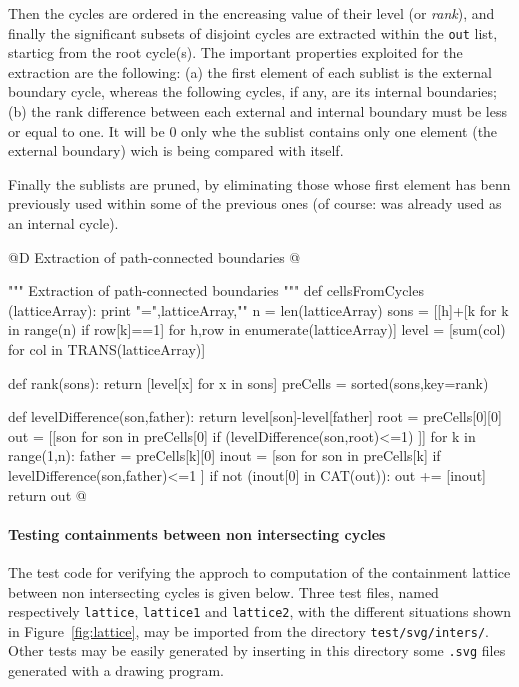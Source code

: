 \documentclass[11pt,oneside]{article}	%
\begin{document}
Then the cycles are ordered in the encreasing value of their level (or \emph{rank}), and finally the significant subsets of disjoint cycles are extracted within the \texttt{out} list, starticg from the root cycle(s). The important properties exploited for the extraction are the following: (a) the first element of each sublist is the external boundary cycle, whereas the following cycles, if any, are its internal boundaries; (b) the rank difference between each external and internal boundary must be less or equal to one. It will be 0 only whe the sublist contains only one element (the external boundary) wich is being compared with itself.

Finally the sublists are pruned, by eliminating those whose first element has benn previously used within some of the previous ones (of course: was already used as an internal cycle).

@D Extraction of path-connected boundaries
@{""" Extraction of path-connected boundaries """
def cellsFromCycles (latticeArray):
    print "\nlatticeArray =\n",latticeArray,"\n"
    n = len(latticeArray)
    sons = [[h]+[k for k in range(n) if row[k]==1] for h,row in enumerate(latticeArray)]
    level = [sum(col) for col in TRANS(latticeArray)]
    
    def rank(sons): return [level[x] for x in sons]
    preCells = sorted(sons,key=rank)

    def levelDifference(son,father): return level[son]-level[father]
    root = preCells[0][0]
    out = [[son for son in preCells[0] if (levelDifference(son,root)<=1) ]]
    for k in range(1,n):
        father = preCells[k][0]
        inout = [son for son in preCells[k] if levelDifference(son,father)<=1 ]
        if not (inout[0] in CAT(out)):
            out += [inout]
    return out        
@}

\paragraph{Testing containments between non intersecting cycles}

The test code for verifying the approch to computation of the containment lattice between non intersecting cycles is given below. Three test files, named respectively \texttt{lattice}, \texttt{lattice1} and \texttt{lattice2},  with the different situations shown in Figure~\ref{fig:lattice}, may be imported from the directory \texttt{test/svg/inters/}. Other tests may be easily generated by inserting in this directory some \texttt{.svg} files generated with a drawing program. 
\end{document}
